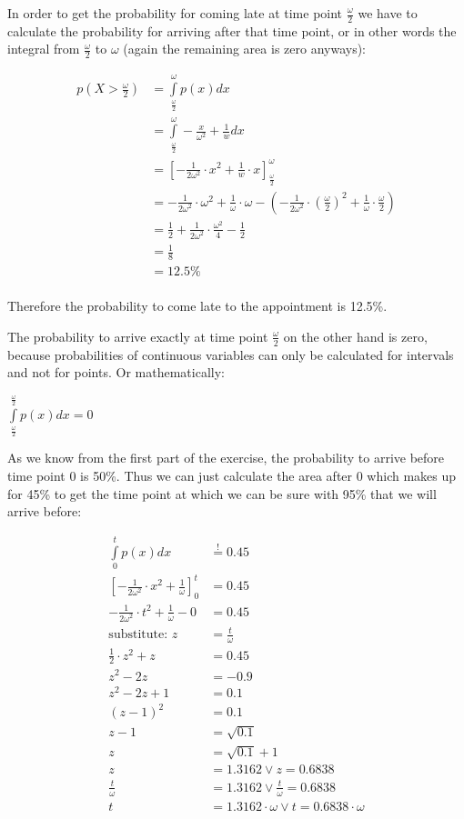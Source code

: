 In order to get the probability for coming late at time point $\frac{\omega}{2}$ we have to calculate the probability for arriving after that time point, or in other words the integral from $\frac{\omega}{2}$ to $\omega$ (again the remaining area is zero anyways):

\begin{align*}
  p\left(X > \frac{\omega}{2}\right) &= \int\limits_{\frac{\omega}{2}}^{\omega} p(x) dx \\
  &= \int\limits_{\frac{\omega}{2}}^{\omega} -\frac{x}{\omega^2} + \frac{1}{w} dx \\
  &= \left[-\frac{1}{2\omega^2}\cdot x^2 + \frac{1}{w}\cdot x\right]_{\frac{\omega}{2}}^{\omega} \\
  &= -\frac{1}{2\omega^2}\cdot \omega^2 + \frac{1}{\omega}\cdot \omega - \left(-\frac{1}{2\omega^2}\cdot \left(\frac{\omega}{2}\right)^2 + \frac{1}{\omega}\cdot \frac{\omega}{2}\right) \\
  &= \frac{1}{2} + \frac{1}{2\omega^2}\cdot\frac{\omega^2}{4} - \frac{1}{2}\\
  &= \frac{1}{8}\\
  &= 12.5\% \\
\end{align*}

Therefore the probability to come late to the appointment is 12.5\%.

The probability to arrive exactly at time point $\frac{\omega}{2}$ on the other hand is zero, because probabilities of continuous variables can only be calculated for intervals and not for points. Or mathematically:

$\int\limits_{\frac{\omega}{2}}^{\frac{\omega}{2}} p(x)dx = 0$

As we know from the first part of the exercise, the probability to arrive before time point 0 is 50\%. Thus we can just calculate the area after 0 which makes up for 45\% to get the time point at which we can be sure with 95\%  that we will arrive before:

\begin{align*}
  \int\limits_{0}^{t} p(x)dx &\stackrel{!}{=} 0.45 \\
  \left[-\frac{1}{2\omega^2}\cdot x^2 + \frac{1}{\omega}\right]_0^t & = 0.45 \\
  -\frac{1}{2\omega^2}\cdot t^2 + \frac{1}{\omega} - 0 &= 0.45 \\
 \mbox{substitute: }z&=\frac{t}{\omega} \\
  \frac{1}{2}\cdot z^2 + z &= 0.45 \\
  z^2 - 2z &= -0.9 \\
  z^2 - 2z + 1 &= 0.1 \\
  \left(z-1\right)^2 &= 0.1 \\
  z-1 &= \sqrt{0.1} \\
  z &= \sqrt{0.1} + 1 \\
  z &= 1.3162 \vee  z = 0.6838 \\
  \frac{t}{\omega} &= 1.3162 \vee  \frac{t}{\omega} = 0.6838 \\
  t &= 1.3162\cdot \omega \vee t  = 0.6838 \cdot \omega
\end{align*}

